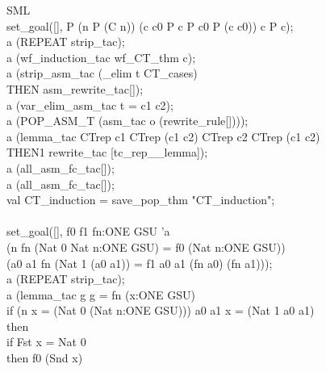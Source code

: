 {\begin{GFT}{SML}
\+\\
\+set\_goal([], \PrKM{}\MMM{\forall}P\MMM{\bullet} (\MMM{\forall}n\MMM{\bullet} P (C n)) \MMM{\land} (\MMM{\forall}c c0\MMM{\bullet} P c \MMM{\land} P c0 \MMM{\Rightarrow} P (c  c0)) \MMM{\Rightarrow} \MMM{\forall}c\MMM{\bullet} P c\PrKO{});\\
\+a (REPEAT strip\_tac);\\
\+a (wf\_induction\_tac wf\_CT\_thm \PrKM{}c\PrKO{});\\
\+a (strip\_asm\_tac (\MMM{\forall}\_elim \PrKM{}t\PrKO{} CT\_cases)\\
\+	THEN asm\_rewrite\_tac[]);\\
\+a (var\_elim\_asm\_tac \PrKM{}t = c1  c2\PrKO{});\\
\+a (POP\_ASM\_T (asm\_tac o (rewrite\_rule[])));\\
\+a (lemma\_tac \PrKM{}CTrep c1 \MMM{\in}\PrJL{+} CTrep (c1  c2) \MMM{\land} CTrep c2 \MMM{\in}\PrJL{+} CTrep (c1  c2)\PrKO{}\\
\+	THEN1 rewrite\_tac [tc\MMM{\in}\_rep\_\_lemma]);\\
\+a (all\_asm\_fc\_tac[]);\\
\+a (all\_asm\_fc\_tac[]);\\
\+val CT\_induction = save\_pop\_thm "CT\_induction";\\
\+\\
\+set\_goal([], \PrKM{}\MMM{\forall}f0 f1\MMM{\bullet} \MMM{\exists}fn:ONE GSU \MMM{\rightarrow} 'a\MMM{\bullet}\\
\+	(\MMM{\forall}n\MMM{\bullet} fn (Nat 0 \MMM{\mapsto} Nat n:ONE GSU) = f0 (Nat n:ONE GSU))\\
\+	\MMM{\land} (\MMM{\forall}a0 a1\MMM{\bullet} fn (Nat 1 \MMM{\mapsto} (a0 \MMM{\mapsto} a1)) = f1 a0 a1 (fn a0) (fn a1))\PrKO{});\\
\+a (REPEAT strip\_tac);\\
\+a (lemma\_tac \PrKM{}\MMM{\exists}g\MMM{\bullet} g = \MMM{\lambda}fn (x:ONE GSU)\MMM{\bullet}\\
\+  if (\MMM{\exists}n\MMM{\bullet} x = (Nat 0 \MMM{\mapsto} (Nat n:ONE GSU))) \MMM{\lor} \MMM{\exists}a0 a1\MMM{\bullet} x = (Nat 1 \MMM{\mapsto} a0 \MMM{\mapsto} a1)\\
\+  then\\
\+	if Fst x = Nat 0\\
\+	then f0 (Snd x)\\

\end{GFT}}
